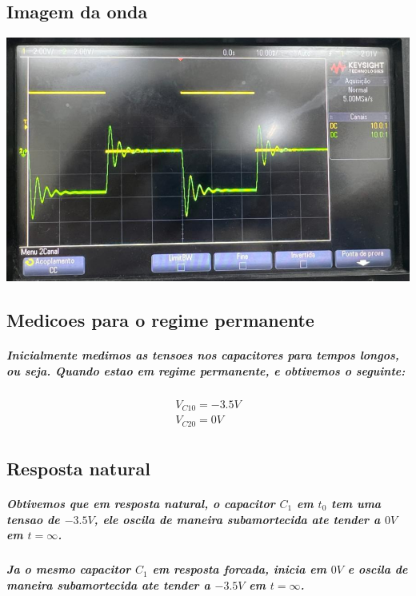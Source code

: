 \documentclass[12pt,twoside, a4paper, twocolumn]{article}
\begin{document}
\subsection{Imagem da onda}

\begin{adjustbox}{scale=0.25}
    \includegraphics{Figure_1.png}
\end{adjustbox}

\subsection{Medicoes para o regime permanente}

\subparagraph*{Inicialmente medimos as tensoes nos capacitores para tempos longos, ou seja. Quando estao em regime permanente, e obtivemos o seguinte:}

\begin{equation*}
    \begin{aligned}
        V_{C10} = -3.5V \\
        V_{C20} = 0V    \\
    \end{aligned}
\end{equation*}

\subsection{Resposta natural}

\subparagraph*{Obtivemos que em resposta natural, o capacitor $C_1$ em $t_0$ tem uma tensao de $-3.5V$, ele oscila de maneira subamortecida ate tender a $0V$ em $t = \infty$.}

\subparagraph*{Ja o mesmo capacitor $C_1$ em resposta forcada, inicia em $0V$ e oscila de maneira subamortecida ate tender a $-3.5V$ em $t = \infty$.}
\end{document}
